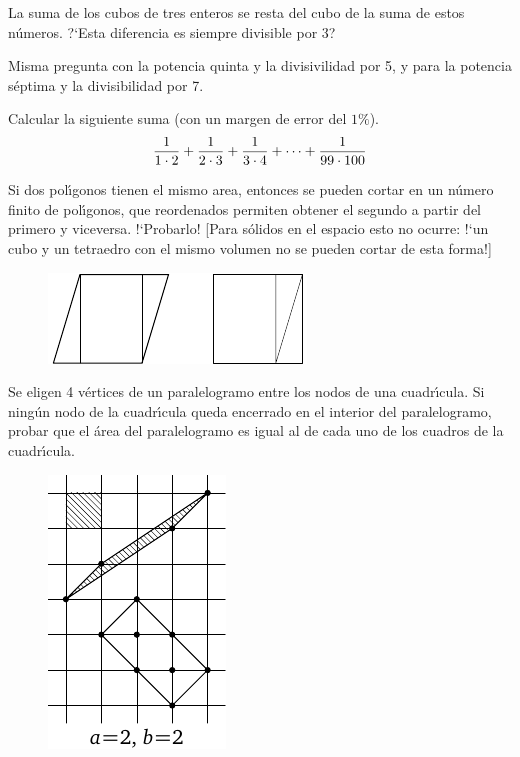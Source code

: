 \documentclass[12pt]{article}  %
\begin{document}
 La suma de los cubos de tres enteros se resta del cubo de la suma de estos n\'umeros. ?`Esta diferencia es siempre divisible por 3?

\bigskip
{} Misma pregunta con la potencia quinta y la divisivilidad por 5, y para la potencia s\'eptima y la divisibilidad por 7.

\bigskip
{} Calcular la siguiente suma (con un margen de error del $1\%$).
$${1 \over 1\cdot 2} +  {1 \over 2\cdot 3} + {1 \over 3\cdot 4} + \dots + {1 \over 99\cdot 100}$$


\bigskip
{} Si dos pol\'{\i}gonos tienen el mismo area, entonces se pueden cortar en un n\'umero finito de pol\'{\i}gonos, que reordenados permiten obtener el segundo a partir del primero y viceversa. !`Probarlo! [Para s\'olidos en el espacio esto no ocurre: !`un cubo y un tetraedro con el mismo volumen no se pueden cortar de esta forma!]
\begin{figure}[h]
\centering
\includegraphics{q39_horizontal}\\[6pt]
\end{figure}


 Se eligen 4 v\'ertices de un paralelogramo entre los nodos de una cuadr\'{\i}cula. Si ning\'un nodo de la cuadr\'{\i}cula queda encerrado en el interior del paralelogramo, probar que el \'area del paralelogramo es igual al de cada uno de los cuadros de la cuadr\'{\i}cula. 
\begin{figure}[h]
 \centering
\includegraphics{taskbook-24}\vskip3pt
\end{figure}
\end{document}
